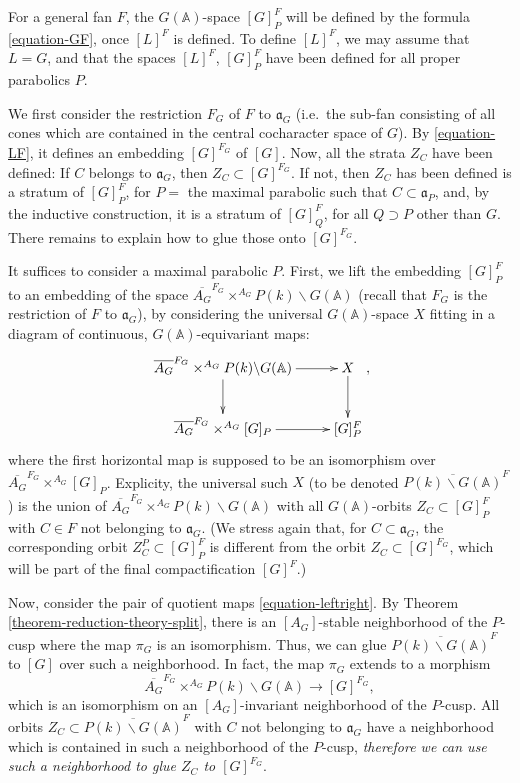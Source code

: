 For a general fan $F$, the $G(\mathbb A)$-space $[G]_P^{F}$ will be defined by the formula \eqref{equation-GF}, once $[L]^{F}$ is defined. To define $[L]^F$, we may assume that $L=G$, and that the spaces $[L]^{F}$, $[G]_P^{F}$ have been defined for all proper parabolics $P$.

We first consider the restriction $F_G$ of $F$ to $\mathfrak a_G$ (i.e.\ the sub-fan consisting of all cones which are contained in the central cocharacter space of $G$). By \eqref{equation-LF}, it defines an embedding $[G]^{F_G}$ of $[G]$. Now, all the strata $Z_C$ have been defined: If $C$ belongs to $\mathfrak a_G$, then $Z_C\subset [G]^{F_G}$. If not, then $Z_C$ has been defined is a stratum of $[G]_P^F$, for $P=$ the maximal parabolic such that $C\subset \mathfrak a_P$, and, by the inductive construction, it is a stratum of $[G]_Q^F$, for all $Q\supset P$ other than $G$. There remains to explain how to glue those onto $[G]^{F_G}$. 

It suffices to consider a maximal parabolic $P$. 
First, we lift the embedding $[G]_P^{F}$ to an embedding of the space $\overline{A_G}^{F_G} \times^{A_G} P(k)\backslash G(\mathbb A)$ (recall that $F_G$ is the restriction of $F$ to $\mathfrak a_G$), by considering the universal $G(\mathbb A)$-space $X$ fitting in a diagram of continuous, $G(\mathbb A)$-equivariant maps:
$$ \xymatrix{\overline{A_G}^{F_G} \times^{A_G} P(k)\backslash G(\mathbb A) \ar[d] \ar[r] & X \ar[d] \\ \overline{A_G}^{F_G} \times^{A_G} [G]_P \ar[r] & [G]_P^F},$$
where the first horizontal map is supposed to be an isomorphism over $\overline{A_G}^{F_G} \times^{A_G} [G]_P$.
Explicity, the universal such $X$ (to be denoted $\overline{P(k)\backslash G(\mathbb A)}^F$) is the union of $\overline{A_G}^{F_G} \times^{A_G} P(k)\backslash G(\mathbb A)$ with all $G(\mathbb A)$-orbits $Z_C\subset [G]_P^F$ with $C\in F$ not belonging to $\mathfrak a_G$. (We stress again that, for $C\subset \mathfrak a_G$, the corresponding orbit $Z_C^P\subset [G]_P^F$ is different from the orbit $Z_C \subset [G]^{F_G}$, which will be part of the final compactification $[G]^F$.)

Now, consider the pair of quotient maps \eqref{equation-leftright}. By Theorem \ref{theorem-reduction-theory-split}, there is an $[A_G]$-stable neighborhood of the $P$-cusp where the map $\pi_G$ is an isomorphism. Thus, we can glue $\overline{P(k)\backslash G(\mathbb A)}^F$ to $[G]$ over such a neighborhood. In fact, the map $\pi_G$ extends to a morphism 
$$ \overline{A_G}^{F_G} \times^{A_G} P(k)\backslash G(\mathbb A) \to [G]^{F_G},$$
which is an isomorphism on an $[A_G]$-invariant neighborhood of the $P$-cusp. All orbits $Z_C\subset \overline{P(k)\backslash G(\mathbb A)}^F$ with $C$ not belonging to $\mathfrak a_G$ have a neighborhood which is contained in such a neighborhood of the $P$-cusp, \emph{therefore we can use such a neighborhood to glue $Z_C$ to $[G]^{F_G}$}. 

